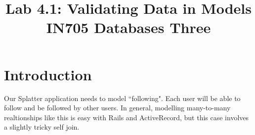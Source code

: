 \documentclass{article}
\begin{document}
\title{Lab 4.1: Validating Data in Models\\ IN705 Databases Three}
\date{}
\maketitle

\section*{Introduction}
Our Splatter application needs to model ``following".  Each user will be able to follow and be followed by other users.  In general, modelling many-to-many realtionships like this is easy with Rails and ActiveRecord, but this case involves a slightly tricky self join.
\end{document}
